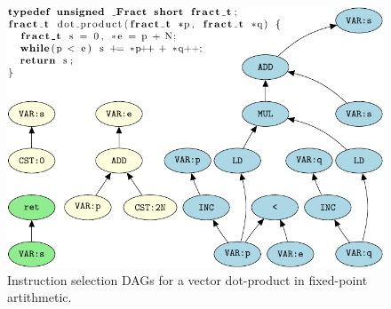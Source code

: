 \begin{figure}[ht]
\begin{center}


    \includegraphics{pgf-fig003}
  \end{center}
  \caption{Instruction selection DAGs for a vector dot-product in
    fixed-point artithmetic.}\label{fig:dot_product}
\end{figure}

